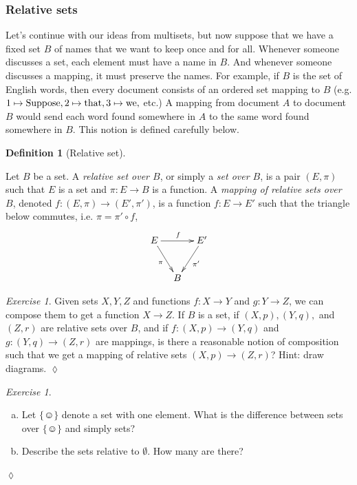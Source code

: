 \documentclass{book}
\def\tn{\textnormal}
\def\singleton{\{\smiley\}}
\def\to{\rightarrow}
\def\taking{\colon}
\theoremstyle{remark}
\newtheorem{exc}[subsubsection]{Exercise}
\newenvironment{exercise}{\begin{exc}}{\hspace*{\fill}$\lozenge$\end{exc}}
\theoremstyle{definition}
\newtheorem{definition}[subsubsection]{Definition}
\def\sexc{\begin{enumerate}[a.)]\setlength{\itemsep}{.1cm}\setlength{\parskip}{.1cm}\item}
\def\next{\item}
\def\endsexc{\end{enumerate}}
\begin{document}

\subsubsection{Relative sets}\label{sec:relative sets}

Let's continue with our ideas from multisets, but now suppose that we have a fixed set $B$ of names that we want to keep once and for all. Whenever someone discusses a set, each element must have a name in $B$. And whenever someone discusses a mapping, it must preserve the names. For example, if $B$ is the set of English words, then every document consists of an ordered set mapping to $B$ (e.g. $1\mapsto \tn{Suppose}, 2\mapsto\tn{that}, 3\mapsto\tn{we},$ etc.) A mapping from document $A$ to document $B$ would send each word found somewhere in $A$ to the same word found somewhere in $B$. This notion is defined carefully below.

\begin{definition}[Relative set]\label{def:relative sets}

Let $B$ be a set. A {\em relative set over $B$}, or simply a {\em set over $B$}, is a pair $(E,\pi)$ such that $E$ is a set and $\pi\taking E\to B$ is a function. A {\em mapping of relative sets over $B$}, denoted $f\taking (E,\pi)\to(E',\pi')$, is a function $f\taking E\to E'$ such that the triangle below commutes, i.e. $\pi=\pi'\circ f$,
$$
\xymatrix@=10pt{E\ar[rr]^f\ar[rdd]_{\pi}&&E'\ar[ldd]^{\pi'}\\\\&B
}
$$

\end{definition}

\begin{exercise}
Given sets $X,Y,Z$ and functions $f\taking X\to Y$ and $g\taking Y\to Z$, we can compose them to get a function $X\to Z$. If $B$ is a set, if $(X,p), (Y,q),$ and $(Z,r)$ are relative sets over $B$, and if $f\taking (X,p)\to (Y,q)$ and $g\taking (Y,q)\to (Z,r)$ are mappings, is there a reasonable notion of composition such that we get a mapping of relative sets $(X,p)\to (Z,r)$? Hint: draw diagrams.
\end{exercise}

\begin{exercise}~
\sexc Let $\singleton$ denote a set with one element. What is the difference between sets over $\singleton$ and simply sets?
\next Describe the sets relative to $\emptyset$. How many are there?
\endsexc
\end{exercise}
\end{document}

